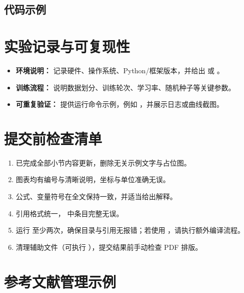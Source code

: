 \documentclass{applemlr}
\begin{document}
\subsection{代码示例}



\section{实验记录与可复现性}
\label{sec:repro}

\begin{itemize}
  \item \textbf{环境说明：} 记录硬件、操作系统、Python/框架版本，并给出  或 。
  \item \textbf{训练流程：} 说明数据划分、训练轮次、学习率、随机种子等关键参数。
  \item \textbf{可重复验证：} 提供运行命令示例，例如 ，并展示日志或曲线截图。
\end{itemize}

\section{提交前检查清单}
\label{sec:checklist}

\begin{enumerate}
  \item 已完成全部小节内容更新，删除无关示例文字与占位图。
  \item 图表均有编号与清晰说明，坐标与单位准确无误。
  \item 公式、变量符号在全文保持一致，并适当给出解释。
  \item 引用格式统一， 中条目完整无误。
  \item 运行  至少两次，确保目录与引用无报错；若使用 ，请执行额外编译流程。
  \item 清理辅助文件（可执行 ），提交结果前手动检查 PDF 排版。
\end{enumerate}




\appendix

\section{参考文献管理示例}
\label{sec:bib}
\end{document}
